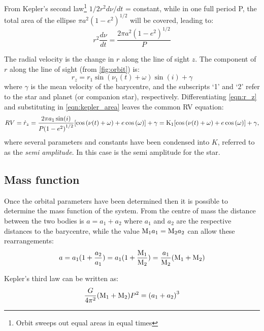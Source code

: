From Kepler's second law\footnote{Orbit sweeps out equal areas in equal times} \(1/2 r^{2} d\nu/dt\) = constant, while in one full period P, the total area of the ellipse \(\pi a^{2}{(1 - e^{2})}^{1/2} \) will be covered, leading to: 
\begin{equation}
r^2 \frac{d\nu}{dt} = \frac{2\pi a^{2}(1-e^{2})^{1/2}}{P} \label{eqn:kepler_area}
\end{equation}

The radial velocity is the change in $r$ along the line of sight $z$.
The component of $r$ along the line of sight (from \cref{fig:orbit}) is:
\begin{equation}
   r_z =  r_1 \sin(\nu_1(t) + \omega)\sin(i) + \gamma \label{eqn:r_z}
\end{equation}
where $\gamma$ is the mean velocity of the barycentre, and the subscripts `1' and `2' refer to the star and planet (or companion star), respectively.
Differentiating \cref{eqn:r_z} and substituting in \cref{eqn:kepler_area} leaves the common RV equation:
\begin{equation}
\label{eqn:rv_equation}
{RV} = \dot{r}_z= \frac{2 \pi a_1 \sin(i)}{P{(1-e^{2})}^{1/2}} [\cos{(\nu(t) + \omega)} + e\cos{(\omega)}] + \gamma
     = \textrm{K}_{1} [\cos{(\nu(t) + \omega)} + e\cos{(\omega)}] + \gamma,
\end{equation}
where several parameters and constants have been condensed into $K$, referred to as the \emph{semi amplitude}.
In this case \Kone{} is the semi amplitude for the star.


\subsection{Mass function}
Once the orbital parameters have been determined then it is possible to determine the mass function of the system.
From the centre of mass the distance between the two bodies is \(a = a_1 + a_2\) where $a_1$ and $a_2$ are the respective distances to the barycentre, while the value \(\textrm{M}_{1} a_1 = \textrm{M}_{2} a_2\) can allow these rearrangements:
\begin{equation}
a = a_{1} (1 + \frac{a_{2}}{a_{1}}) = a_{1}(1 + \frac{\textrm{M}_{1}}{\textrm{M}_{2}}) = \frac{a_{1}}{\textrm{M}_{2}} (\textrm{M}_{1} + \textrm{M}_{2})
\end{equation}

Kepler's third law can be written as:
\begin{equation}
    \frac{G}{4\pi^{2}}(\textrm{M}_{1} + \textrm{M}_{2})P^{2} = {(a_1 + a_2)}^{3}
\end{equation}

